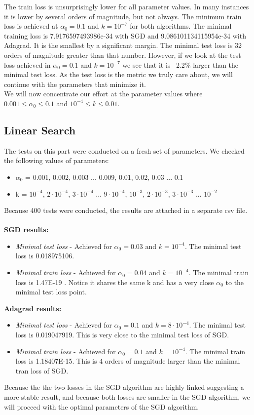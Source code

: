 \documentclass[12pt]{scrartcl}
\begin{document}
The train loss is unsurprisingly lower for all parameter values. In many instances it is lower by several orders of magnitude, but not always. The minimum train loss is achieved at $\alpha_0=0.1$ and $k=10^{-7}$ for both algorithms. The minimal training loss is 7.9176597493986e-34 with SGD and 9.086101134115954e-34 with Adagrad. It is the smallest by a significant margin. The minimal test loss is 32 orders of magnitude greater than that number. However, if we look at the test loss achieved in $\alpha_0=0.1$ and $k=10^{-7}$ we see that it is ~2.2\% larger than the minimal test loss. As the test loss is the metric we truly care about, we will continue with the parameters that minimize it.\\

We will now concentrate our effort at the parameter values where $0.001 \leq \alpha_0 \leq 0.1$ and $10^{-4} \leq k \leq 0.01$.

\subsection{Linear Search}
The tests on this part were conducted on a fresh set of parameters. We checked the following values of parameters:
\begin{itemize}
\item $\alpha_0$ = 0.001, 0.002, 0.003 ... 0.009, 0.01, 0.02, 0.03 ... 0.1
\item k = $10^{-4}$, $2 \cdot 10^{-4}$, $3 \cdot 10^{-4}$ ... $9 \cdot 10^{-4}$, $10^{-3}$, $2 \cdot 10^{-3}$, $3 \cdot 10^{-3}$ ... $10^{-2}$
\end{itemize}

Because 400 tests were conducted, the results are attached in a separate csv file.\\\\
\textbf{SGD results:}
\begin{itemize}
\item \textit{Minimal test loss} - Achieved for $\alpha_0 = 0.03$ and $k=10^{-4}$. The minimal test loss is 0.018975106.
\item \textit{Minimal train loss} - Achieved for $\alpha_0 = 0.04$ and $k=10^{-4}$. The minimal train loss is 1.47E-19
. Notice it shares the same k and has a very close $\alpha_0$ to the minimal test loss point.
\end{itemize}

\textbf{Adagrad results:}
\begin{itemize}
\item \textit{Minimal test loss} - Achieved for $\alpha_0 = 0.1$ and $k=8\cdot 10^{-4}$. The minimal test loss is 0.019047919. This is very close to the minimal test loss of SGD.
\item \textit{Minimal train loss} - Achieved for $\alpha_0 = 0.1$ and $k=10^{-4}$. The minimal train loss is 1.18407E-15. This is 4 orders of magnitude larger than the minimal tran loss of SGD.
\end{itemize}
Because the the two losses in the SGD algorithm are highly linked suggesting a more stable result, and because both losses are smaller in the SGD algorithm, we will proceed with the optimal parameters of the SGD algorithm.
\end{document}

